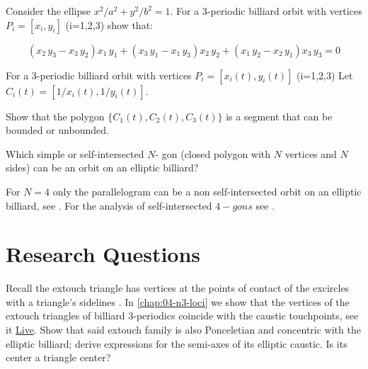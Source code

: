 \begin{exercise}
 Consider the ellipse $x^2/a^2+y^2/b^2=1$. For a  3-periodic  billiard orbit with vertices $P_i=[x_i,y_i]$ (i=1,2,3)  show that:  

\[ 
 \left( x_2\,y_3-x_3\,y_2 \right) x_1\,
y_1+ \left(x_3\,y_1  - x_1\,y_3\right) x_2\, y_2+ \left( x_1\,y_2-x_2\,y_1 \right) x_3
\,y_3=0
\]

\end{exercise}

\begin{exercise} For a  3-periodic  billiard orbit with vertices $P_i=[x_i(t),y_i(t)]$ (i=1,2,3)
Let $C_i(t)=[1/x_i(t),1/y_i(t)]$. 

Show that the polygon $\{C_1(t),C_2(t),C_3(t)\}$ is a segment that can be bounded or unbounded.
 \label{exe:chap02-inverse-envelope}
\end{exercise}

\begin{exercise} Which simple or self-intersected $N$- gon (closed polygon with $N$ vertices and $N$ sides) can be an orbit on an elliptic billiard? 

 For $N=4$ only the parallelogram can be a non self-intersected orbit on an elliptic billiard, see \cite{connes07}. For the analysis of self-intersected $4-gons$ see \cite{garcia2020-self-intersected}.
\end{exercise}

\section{Research Questions}

\begin{question}
Recall the extouch triangle has vertices at the points of contact of the excircles with a triangle's sidelines \cite[Extouch triangle]{mw}. 
In \cref{chap:04-n3-loci} we show that the vertices of the extouch triangles of billiard 3-periodics coincide with the caustic touchpoints, see it 
\href{https://bit.ly/33PufRv}{Live}. Show that said extouch family is also Ponceletian and concentric with the elliptic billiard; derive expressions for the semi-axes of its elliptic caustic. Is its center a triangle center? 
\label{que:03-extouch}
\end{question}
